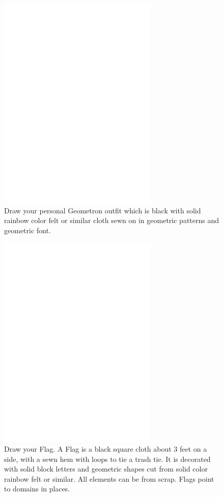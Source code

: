 \begin{figure}
	\centering
	\includegraphics[width=3in]{figures/shapes/blank.png}
    \caption[outfit]
	{Draw your personal Geometron outfit which is black with solid rainbow color felt or similar cloth sewn on in geometric patterns and geometric font.}
\end{figure}
\begin{figure}
	\centering
	\includegraphics[width=3in]{figures/shapes/blank.png}
    \caption[outfit]
	{Draw your Flag.  A Flag is a black square cloth about 3 feet on a side, with a sewn hem with loops to tie a trash tie.  It is decorated with solid block letters and geometric shapes cut from solid color rainbow felt or similar.  All elements can be from scrap.  Flags point to domains in places.} 
\end{figure}
